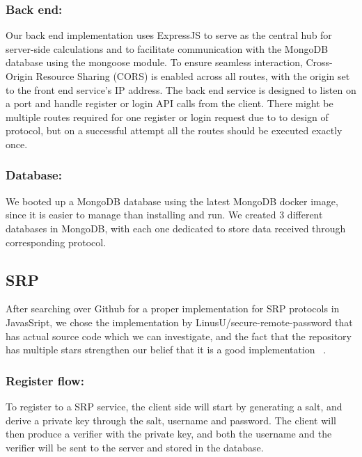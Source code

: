 \subsubsection{Back end:}

Our back end implementation uses ExpressJS to serve as the central hub for server-side calculations and to facilitate communication with the MongoDB database using the mongoose module.
To ensure seamless interaction, Cross-Origin Resource Sharing (CORS) is enabled across all routes, with the origin set to the front end service's IP address. 
The back end service is designed to listen on a port and handle register or login API calls from the client. 
There might be multiple routes required for one register or login request due to to design of protocol, but on a successful attempt all the routes should be executed exactly once.

\subsubsection{Database:}
We booted up a MongoDB database using the latest MongoDB docker image, since it is easier to manage than installing and run. 
We created 3 different databases in MongoDB, with each one dedicated to store data received through corresponding protocol.

\subsection{SRP}
After searching over Github for a proper implementation for SRP protocols in JavasSript, we chose the implementation by LinusU/\newline secure-remote-password that has actual source code which we can investigate, and the fact that the repository has multiple stars strengthen our belief that it is a good implementation ~\cite{SRPrepo}. 

\subsubsection{Register flow:}
To register to a SRP service, the client side will start by generating a salt, and derive a private key through the salt, username and password.
The client will then produce a verifier with the private key, and both the username and the verifier will be sent to the server and stored in the database.



